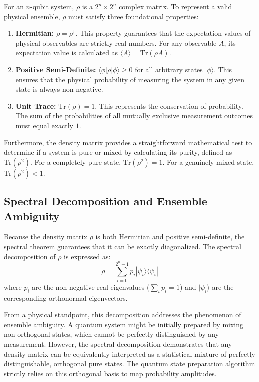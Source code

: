 \documentclass[12pt]{article}
\begin{document}
For an $n$-qubit system, $\rho$ is a $2^n \times 2^n$ complex matrix. To represent a valid physical ensemble, $\rho$ must satisfy three foundational properties:
\begin{enumerate}
    \item \textbf{Hermitian:} $\rho = \rho^\dagger$. This property guarantees that the expectation values of physical observables are strictly real numbers. For any observable $A$, its expectation value is calculated as $\langle A \rangle = \text{Tr}(\rho A)$.
    \item \textbf{Positive Semi-Definite:} $\langle \phi | \rho | \phi \rangle \geq 0$ for all arbitrary states $|\phi\rangle$. This ensures that the physical probability of measuring the system in any given state is always non-negative.
    \item \textbf{Unit Trace:} $\text{Tr}(\rho) = 1$. This represents the conservation of probability. The sum of the probabilities of all mutually exclusive measurement outcomes must equal exactly $1$.
\end{enumerate}

Furthermore, the density matrix provides a straightforward mathematical test to determine if a system is pure or mixed by calculating its purity, defined as $\text{Tr}(\rho^2)$. For a completely pure state, $\text{Tr}(\rho^2) = 1$. For a genuinely mixed state, $\text{Tr}(\rho^2) < 1$.

\subsection{Spectral Decomposition and Ensemble Ambiguity}
Because the density matrix $\rho$ is both Hermitian and positive semi-definite, the spectral theorem guarantees that it can be exactly diagonalized. The spectral decomposition of $\rho$ is expressed as:
\begin{equation}
    \rho = \sum_{i=0}^{2^n-1} p_i |\psi_i\rangle \langle \psi_i|
\end{equation}
where $p_i$ are the non-negative real eigenvalues ($\sum_i p_i = 1$) and $|\psi_i\rangle$ are the corresponding orthonormal eigenvectors.

From a physical standpoint, this decomposition addresses the phenomenon of ensemble ambiguity. A quantum system might be initially prepared by mixing non-orthogonal states, which cannot be perfectly distinguished by any measurement. However, the spectral decomposition demonstrates that any density matrix can be equivalently interpreted as a statistical mixture of perfectly distinguishable, orthogonal pure states. The quantum state preparation algorithm strictly relies on this orthogonal basis to map probability amplitudes.
\end{document}

